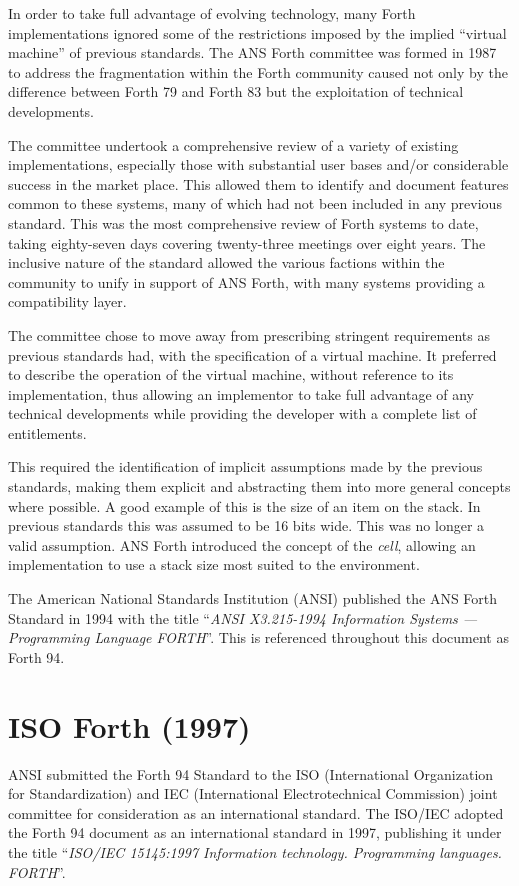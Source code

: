 In order to take full advantage of evolving technology, many Forth
implementations ignored some of the restrictions imposed by the
implied ``virtual machine'' of previous standards.
The ANS Forth committee was formed in 1987 to address the fragmentation
within the Forth community caused not only by the difference between
Forth 79 and Forth 83 but the exploitation of technical developments.

The committee undertook a comprehensive review of a variety of existing
implementations, especially those with substantial user bases and/or
considerable success in the market place.  This allowed them to identify
and document features common to these systems, many of which had not been
included in any previous standard.
This was the most comprehensive review of Forth systems to date, taking
eighty-seven days covering twenty-three meetings over eight years.
The inclusive nature of the standard allowed the various factions within
the community to unify in support of ANS Forth, with many systems
providing a compatibility layer.


The committee chose to move away from prescribing stringent requirements
as previous standards had, with the specification of a virtual machine.
It preferred to describe the operation of the virtual machine, without
reference to its implementation, thus allowing an implementor to take
full advantage of any technical developments while providing the
developer with a complete list of entitlements.

This required the identification of implicit assumptions made by the
previous standards, making them explicit and abstracting them into
more general concepts where possible.  A good example of this is the
size of an item on the stack.  In previous standards this was assumed
to be 16 bits wide.  This was no longer a valid assumption.  ANS Forth
introduced the concept of the \emph{cell}, allowing an implementation
to use a stack size most suited to the environment.

The American National Standards Institution (ANSI) published the ANS
Forth Standard in 1994 with the title ``\emph{ANSI X3.215-1994
Information Systems --- Programming Language FORTH}''.  This is referenced
throughout this document as Forth 94.

\section{ISO Forth (1997)}
\label{diff:iso}

ANSI submitted the Forth 94 Standard to the
ISO (International Organization for Standardization) and
IEC (International Electrotechnical Commission) joint committee for
consideration as an international standard.
The ISO/IEC adopted the Forth 94 document as an international standard
in 1997, publishing it under the title ``\emph{ISO/IEC 15145:1997
Information technology.  Programming languages.  FORTH}''.


